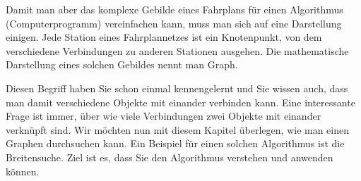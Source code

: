 Damit man aber das komplexe Gebilde eines Fahrplans für einen Algorithmus (Computerprogramm) vereinfachen kann, muss man sich auf eine Darstellung einigen. 
Jede Station eines Fahrplannetzes ist ein Knotenpunkt, von dem verschiedene Verbindungen zu  anderen Stationen ausgehen. 
Die mathematische Darstellung eines solchen Gebildes nennt man Graph.

Diesen Begriff haben Sie schon einmal kennengelernt und Sie wissen auch, dass man damit verschiedene Objekte mit einander verbinden kann. 
Eine interessante Frage ist immer, über wie viele Verbindungen zwei Objekte mit einander verknüpft sind. 
Wir möchten nun mit diesem Kapitel überlegen, wie man einen Graphen durchsuchen kann.
Ein Beispiel für einen solchen Algorithmus ist die Breitensuche. 
Ziel ist es, dass Sie den Algorithmus verstehen und anwenden können. 

%


